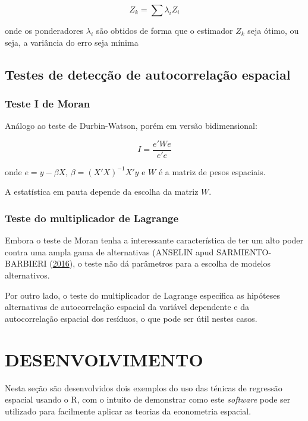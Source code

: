 \documentclass[12pt,]{article}
\begin{document}
\begin{equation}
  \label{eq-krigagem}
  Z_k = \sum{\lambda_i Z_i}
\end{equation}

onde os ponderadores \(\lambda_i\) são obtidos de forma que o estimador
\(Z_k\) seja ótimo, ou seja, a variância do erro seja mínima

\subsection{Testes de detecção de autocorrelação
espacial}\label{testes-de-deteccao-de-autocorrelacao-espacial}

\subsubsection{Teste I de Moran}\label{teste-i-de-moran}

Análogo ao teste de Durbin-Watson, porém em versão bidimensional:

\begin{equation}
  \label{eq-moran}
  I = \frac{e'We}{e'e}
\end{equation}

onde \(e = y - \beta X\), \(\beta = ({X}'X)^{-1}X'y\) e \(W\) é a matriz
de pesos espaciais.

A estatística em pauta depende da escolha da matriz \(W\).

\subsubsection{Teste do multiplicador de
Lagrange}\label{teste-do-multiplicador-de-lagrange}

Embora o teste de Moran tenha a interessante característica de ter um
alto poder contra uma ampla gama de alternativas (ANSELIN apud
SARMIENTO-BARBIERI (\protect\hyperlink{ref-sarmiento-barbieri}{2016}), o
teste não dá parâmetros para a escolha de modelos alternativos.

Por outro lado, o teste do multiplicador de Lagrange especifica as
hipóteses alternativas de autocorrelação espacial da variável dependente
e da autocorrelação espacial dos resíduos, o que pode ser útil nestes
casos.

\section{DESENVOLVIMENTO}\label{desenvolvimento}

Nesta seção são desenvolvidos dois exemplos do uso das ténicas de
regressão espacial usando o R, com o intuito de demonstrar como este
\emph{software} pode ser utilizado para facilmente aplicar as teorias da
econometria espacial.
\end{document}
